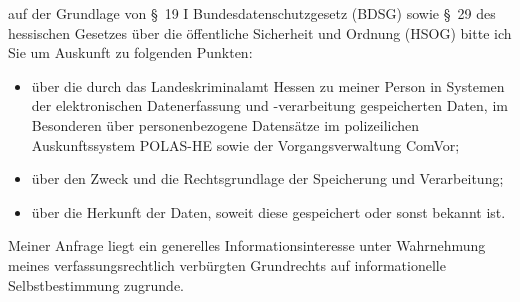 auf der Grundlage von §~19 I Bundesdatenschutzgesetz (BDSG) sowie
§~29 des hessischen Gesetzes über die öffentliche Sicherheit und Ordnung (HSOG)
bitte ich Sie um Auskunft zu folgenden Punkten:

\begin{itemize}
  \item über die durch das Landeskriminalamt Hessen zu meiner Person in Systemen der
  elektronischen Datenerfassung und -verarbeitung gespeicherten Daten, im Besonderen
  über personenbezogene Datensätze im polizeilichen Auskunftssystem POLAS-HE sowie
  der Vorgangsverwaltung ComVor;

  \item über den Zweck und die Rechtsgrundlage der Speicherung und Verarbeitung;

  \item über die Herkunft der Daten, soweit diese gespeichert oder sonst bekannt ist.
\end{itemize}

Meiner Anfrage liegt ein generelles Informationsinteresse unter Wahrnehmung
meines verfassungsrechtlich verbürgten Grundrechts auf informationelle
Selbstbestimmung zugrunde.
